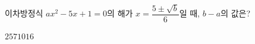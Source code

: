 이차방정식 $ax^2-5x+1=0$의 해가 $x=\dfrac{5\pm\sqrt{b}}{6}$일 때, $b-a$의 값은? 
\begin{choices32}{$2$}{$5$}{$7$}{$10$}{$16$}\end{choices32}
